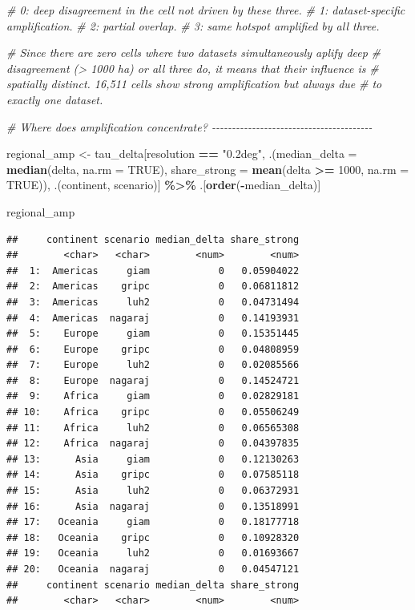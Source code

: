 \documentclass[
  11pt,
]{article}
\newenvironment{Shaded}{\begin{snugshade}}{\end{snugshade}}
\newcommand{\AttributeTok}[1]{\textcolor[rgb]{0.13,0.29,0.53}{#1}}
\newcommand{\CommentTok}[1]{\textcolor[rgb]{0.56,0.35,0.01}{\textit{#1}}}
\newcommand{\ConstantTok}[1]{\textcolor[rgb]{0.56,0.35,0.01}{#1}}
\newcommand{\DecValTok}[1]{\textcolor[rgb]{0.00,0.00,0.81}{#1}}
\newcommand{\FunctionTok}[1]{\textcolor[rgb]{0.13,0.29,0.53}{\textbf{#1}}}
\newcommand{\NormalTok}[1]{#1}
\newcommand{\OtherTok}[1]{\textcolor[rgb]{0.56,0.35,0.01}{#1}}
\newcommand{\SpecialCharTok}[1]{\textcolor[rgb]{0.81,0.36,0.00}{\textbf{#1}}}
\newcommand{\StringTok}[1]{\textcolor[rgb]{0.31,0.60,0.02}{#1}}
\begin{document}
\begin{Shaded}
\begin{Highlighting}[]
\CommentTok{\# 0: deep disagreement in the cell not driven by these three.}
\CommentTok{\# 1: dataset{-}specific amplification.}
\CommentTok{\# 2: partial overlap.}
\CommentTok{\# 3: same hotspot amplified by all three.}

\CommentTok{\# Since there are zero cells where two datasets simultaneously aplify deep}
\CommentTok{\# disagreement (\textgreater{} 1000 ha) or all three do, it means that their influence is}
\CommentTok{\# spatially distinct. 16,511 cells show strong amplification but always due}
\CommentTok{\# to exactly one dataset.}

\CommentTok{\# Where does amplification concentrate? {-}{-}{-}{-}{-}{-}{-}{-}{-}{-}{-}{-}{-}{-}{-}{-}{-}{-}{-}{-}{-}{-}{-}{-}{-}{-}{-}{-}{-}{-}{-}{-}{-}{-}{-}{-}{-}{-}{-}{-}}

\NormalTok{regional\_amp }\OtherTok{\textless{}{-}}\NormalTok{ tau\_delta[resolution }\SpecialCharTok{==} \StringTok{"0.2deg"}\NormalTok{,}
\NormalTok{                          .(}\AttributeTok{median\_delta =} \FunctionTok{median}\NormalTok{(delta, }\AttributeTok{na.rm =} \ConstantTok{TRUE}\NormalTok{),}
                            \AttributeTok{share\_strong =} \FunctionTok{mean}\NormalTok{(delta }\SpecialCharTok{\textgreater{}=} \DecValTok{1000}\NormalTok{, }\AttributeTok{na.rm =} \ConstantTok{TRUE}\NormalTok{)),}
\NormalTok{                          .(continent, scenario)] }\SpecialCharTok{\%\textgreater{}\%}
\NormalTok{  .[}\FunctionTok{order}\NormalTok{(}\SpecialCharTok{{-}}\NormalTok{median\_delta)]}


\NormalTok{regional\_amp}
\end{Highlighting}
\end{Shaded}

\begin{verbatim}
##     continent scenario median_delta share_strong
##        <char>   <char>        <num>        <num>
##  1:  Americas     giam            0   0.05904022
##  2:  Americas    gripc            0   0.06811812
##  3:  Americas     luh2            0   0.04731494
##  4:  Americas  nagaraj            0   0.14193931
##  5:    Europe     giam            0   0.15351445
##  6:    Europe    gripc            0   0.04808959
##  7:    Europe     luh2            0   0.02085566
##  8:    Europe  nagaraj            0   0.14524721
##  9:    Africa     giam            0   0.02829181
## 10:    Africa    gripc            0   0.05506249
## 11:    Africa     luh2            0   0.06565308
## 12:    Africa  nagaraj            0   0.04397835
## 13:      Asia     giam            0   0.12130263
## 14:      Asia    gripc            0   0.07585118
## 15:      Asia     luh2            0   0.06372931
## 16:      Asia  nagaraj            0   0.13518991
## 17:   Oceania     giam            0   0.18177718
## 18:   Oceania    gripc            0   0.10928320
## 19:   Oceania     luh2            0   0.01693667
## 20:   Oceania  nagaraj            0   0.04547121
##     continent scenario median_delta share_strong
##        <char>   <char>        <num>        <num>
\end{verbatim}
\end{document}
